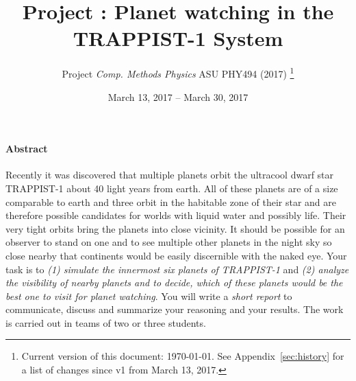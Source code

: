 \documentclass[letterpaper]{scrartcl}
\title{{\Large Project \anumber: Planet watching in the TRAPPIST-1 System}}
\author{{\sffamily\large Project \emph{Comp. Methods Physics} ASU
    PHY494 (2017)}%
  \thanks{Current version of this document: \today. See
    Appendix~\protect\ref{sec:history} for a list of changes since v1
    from March 13, 2017.}}
\date{{\sffamily\large March 13, 2017 -- March 30, 2017}}
\begin{document}
\maketitle

\paragraph{Abstract}

Recently it was discovered that multiple planets orbit the ultracool
dwarf star TRAPPIST-1 about 40 light years from earth. All of these
planets are of a size comparable to earth and three orbit in the
habitable zone of their star and are therefore possible candidates for
worlds with liquid water and possibly life. Their very tight orbits
bring the planets into close vicinity.  It should be possible for an
observer to stand on one and to see multiple other planets in the
night sky so close nearby that continents would be easily discernible
with the naked eye.
%
Your task is to \emph{(1) simulate the innermost six planets of TRAPPIST-1}
and \emph{(2) analyze the visibility of nearby planets and to decide, which
of these planets would be the best one to visit for planet watching}. 
%
You will write a \emph{short report} to communicate, discuss and
summarize your reasoning and your results. The work is carried out in
teams of two or three students.
\end{document}
